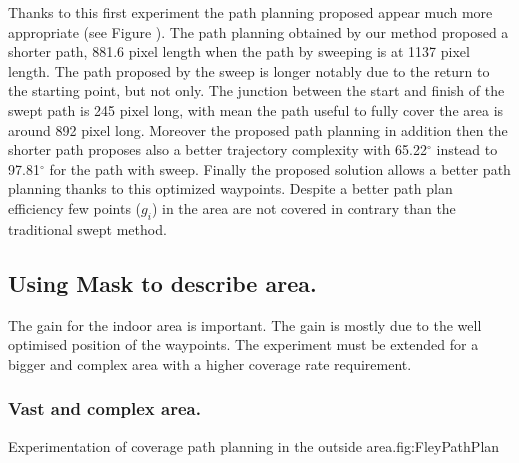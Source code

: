 Thanks to this first experiment the path planning proposed appear much more appropriate (see Figure ). The path planning obtained by our method proposed a shorter path, 881.6 pixel length when  the path by sweeping is at 1137 pixel length. The path proposed by the sweep is longer notably due to the return to the starting point, but not only. The junction between the start and finish of the swept path is 245 pixel long, with mean the path useful to fully cover the area is around 892 pixel long. Moreover the proposed path planning in addition then the shorter path proposes also a better trajectory complexity  with 65.22$^\circ$ instead to 97.81$^\circ$ for the path with sweep.
Finally the proposed solution allows a better path planning thanks to this optimized waypoints. Despite a better path plan efficiency few points ($g_i$) in the area are not covered in contrary than the traditional swept method.



\subsection{Using Mask to describe area.}\label{coverageOutDoor}

The gain for the indoor area is important. The gain is mostly due to the well optimised position of the waypoints. The experiment must be extended for a bigger and complex area with a higher coverage rate requirement.


\subsubsection{Vast and complex area.} \label{fey_map_CPPP}
 
 \begin{mfigures}[!]{Experimentation of coverage path planning in the outside area.}{fig:FleyPathPlan} \centering
\hspace{1cm}

\tabsimuposeFleyPath
\end{mfigures} 
 

